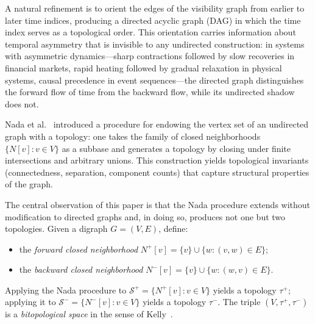 \documentclass[11pt,a4paper]{article}
\theoremstyle{plain}
\theoremstyle{definition}
\newcommand{\Nfwd}[1]{N^{+}[#1]}
\newcommand{\Nbwd}[1]{N^{-}[#1]}
\newcommand{\Ncl}[1]{N[#1]}
\newcommand{\taufwd}{\tau^{+}}
\newcommand{\taubwd}{\tau^{-}}
\newcommand{\subbase}{\mathcal{S}}
\begin{document}
A natural refinement is to orient the edges of the visibility graph from earlier
to later time indices, producing a directed acyclic graph (DAG) in which the
time index serves as a topological order.  This orientation carries information
about temporal asymmetry that is invisible to any undirected construction: in
systems with asymmetric dynamics---sharp contractions followed by slow
recoveries in financial markets, rapid heating followed by gradual relaxation in
physical systems, causal precedence in event sequences---the directed graph
distinguishes the forward flow of time from the backward flow, while its
undirected shadow does not.

Nada et al.~\cite{Nada2018} introduced a procedure for endowing the vertex set
of an undirected graph with a topology: one takes the family of closed
neighborhoods $\{\Ncl{v} : v \in V\}$ as a subbase and generates a topology by
closing under finite intersections and arbitrary unions.  This construction
yields topological invariants (connectedness, separation, component counts) that
capture structural properties of the graph.

The central observation of this paper is that the Nada procedure extends without
modification to directed graphs and, in doing so, produces not one but two
topologies.  Given a digraph $G = (V, E)$, define:
\begin{itemize}[nosep]
  \item the \emph{forward closed neighborhood}
        $\Nfwd{v} = \{v\} \cup \{w : (v,w) \in E\}$;
  \item the \emph{backward closed neighborhood}
        $\Nbwd{v} = \{v\} \cup \{w : (w,v) \in E\}$.
\end{itemize}
Applying the Nada procedure to $\subbase^{+} = \{\Nfwd{v} : v \in V\}$ yields a
topology $\taufwd$; applying it to $\subbase^{-} = \{\Nbwd{v} : v \in V\}$
yields a topology $\taubwd$.  The triple $(V, \taufwd, \taubwd)$ is a
\emph{bitopological space} in the sense of Kelly~\cite{Kelly1963}.
\end{document}
